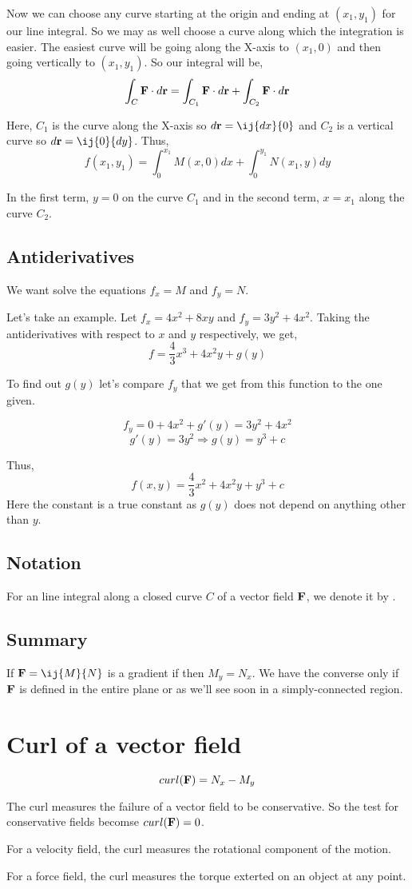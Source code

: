 Now we can choose any curve starting at the origin and ending at $(x_1, y_1)$ for our line integral.
So we may as well choose a curve along which the  integration is easier.
The easiest curve will be going along the X-axis to $(x_1, 0)$ and then going vertically to $(x_1, y_1)$.
So our integral will be,
$$ 
\int_C {\bf F} \cdot d{\bf r} = \int_{C_1} {\bf F} \cdot d{\bf r} +  \int_{C_2} {\bf F} \cdot d{\bf r}
$$

Here,  $C_1$ is the curve along the X-axis so $d{\bf r} = \ij{dx}{0}$ and $C_2$ is a vertical curve so $d{\bf r} = \ij{0}{dy}$.
Thus,
$$
f(x_1, y_1) = \int_0^{x_1} M(x, 0) dx + \int_0^{y_1} N(x_1, y) dy
$$

In the first term, $y = 0$ on the curve $C_1$ and in the second term, $x = x_1$ along the curve $C_2$.


\subsection{Antiderivatives}

We want solve the equations $f_x = M$ and $f_y = N$.

Let's take an example. Let $f_x = 4x^2 + 8xy$ and $f_y = 3y^2 + 4x^2$.
Taking the antiderivatives with respect to $x$ and $y$ respectively, we get,
$$ f = \frac{4}{3}x^3 + 4x^2y + g(y) $$

To find out $g(y)$ let's compare $f_y$ that we get from this function to the one given.

$$ f_y = 0 + 4x^2 + g'(y) = 3y^2 + 4x^2 $$
$$ g'(y) = 3y^2 \Rightarrow g(y) = y^3 + c$$

Thus, $$ f(x, y) = \frac{4}{3} x^2 + 4x^2y + y^3 + c $$
Here the constant is a true constant as $g(y)$ does not depend on anything other than $y$.


\subsection*{Notation}

For an line integral along a closed curve $C$ of a vector field ${\bf F}$, we denote it by
.


\subsection{Summary}

If ${\bf F} = \ij{M}{N}$ is a gradient if then $M_y = N_x$.
We have the converse only if ${\bf F}$ is defined in the entire plane or as we'll see soon in a simply-connected region.


\section{Curl of a vector field}

$$ curl({\bf F}) = N_x - M_y $$

The curl measures the failure of a vector field to be conservative.
So the test for conservative fields becomse $curl({\bf F}) = 0$.

For a velocity field, the curl measures the rotational component of the motion.

For a force field, the curl measures the torque exterted on an object at any point.